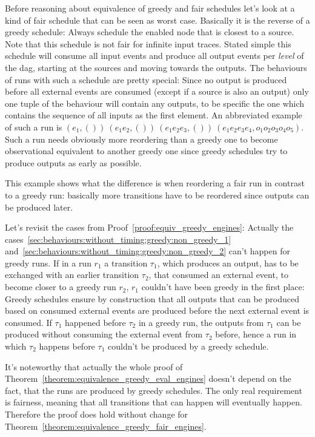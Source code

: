 Before reasoning about equivalence of greedy and fair schedules let's look at a kind of fair schedule that can be seen as worst case.
Basically it is the reverse of a greedy schedule: Always schedule the enabled node that is closest to a source.
Note that this schedule is not fair for infinite input traces.
Stated simple this schedule will consume all input events and produce all output events per \emph{level} of the \gls{dag}, starting at the sources and moving towards the outputs.
The behaviours of runs with such a schedule are pretty special: Since no output is produced before all external events are consumed (except if a source is also an output) only one tuple of the behaviour will contain any outputs, to be specific the one which contains the sequence of all inputs as the first element.
An abbreviated example of such a run is \((e_1,())\ (e_1e_2,())\ (e_1e_2e_3,())\ (e_1e_2e_3e_4,o_1o_2o_3o_4o_5)\).
Such a run needs obviously more reordering than a greedy one to become observational equivalent to another greedy one since greedy schedules try to produce outputs as early as possible.

This example shows what the difference is when reordering a fair run in contrast to a greedy run: basically more transitions have to be reordered since outputs can be produced later.

Let's revisit the cases from Proof~\ref{proof:equiv_greedy_engines}:
Actually the cases~\ref{sec:behaviours:without_timing:greedy:non_greedy_1} and~\ref{sec:behaviours:without_timing:greedy:non_greedy_2} can't happen for greedy runs.
If in a run \(r_1\) a transition \(\tau_1\), which produces an output, has to be exchanged with an earlier transition \(\tau_2\), that consumed an external event, to become closer to a greedy run \(r_2\), \(r_1\) couldn't have been greedy in the first place:
Greedy schedules ensure by construction that all outputs that can be produced based on consumed external events are produced before the next external event is consumed.
If \(\tau_1\) happened before \(\tau_2\) in a greedy run, the outputs from \(\tau_1\) can be produced without consuming the external event from \(\tau_2\) before, hence a run in which \(\tau_2\) happens before \(\tau_1\) couldn't be produced by a greedy schedule.

It's noteworthy that actually the whole proof of Theorem~\ref{theorem:equivalence_greedy_eval_engines} doesn't depend on the fact, that the runs are produced by greedy schedules.
The only real requirement is fairness, meaning that all transitions that can happen will eventually happen.
Therefore the proof does hold without change for Theorem~\ref{theorem:equivalence_greedy_fair_engines}.


